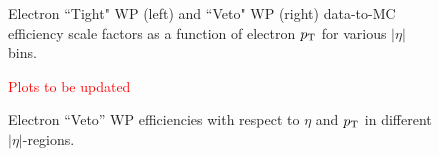 \begin{figure}[htbp]
\begin{center}
  \caption{Electron ``Tight" WP (left) and ``Veto" WP (right) data-to-MC efficiency scale factors as a function of electron $p_\mathrm{T}$ for various $|\eta|$ bins.}
  \label{fig:ele_sf}	
\end{center}
\end{figure}

\begin{figure}[htbp]
\begin{center}
  \caption{Electron ``Veto'' WP efficiencies with respect to  $\eta$ and  $p_\mathrm{T}$ in different $|\eta|$-regions.}\textcolor{red}{Plots to be updated}
  \label{fig:elvetoeff}
\end{center}
\end{figure}

